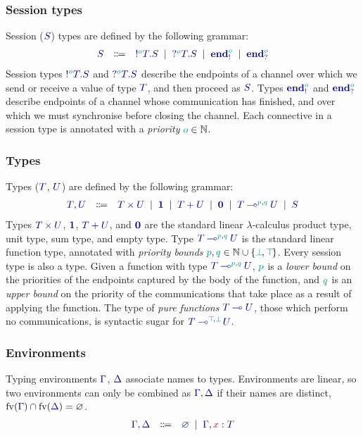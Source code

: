 \documentclass[main.tex]{subfiles}
\begin{document}
\subsubsection*{Session types}
Session ($\ty{S}$) types are defined by the following grammar:
\[
\begin{array}{lcl}
  \ty{S}
  & \Coloneqq & \ty{\tysend[\cs{o}]{T}{S}}
    \sep        \ty{\tyrecv[\cs{o}]{T}{S}}
    \sep        \ty{\tyends[\cs{o}]}
    \sep        \ty{\tyendr[\cs{o}]}
\end{array}
\]
Session types $\ty{\tysend[\cs{o}]{T}{S}}$ and $\ty{\tyrecv[\cs{o}]{T}{S}}$ describe the endpoints of a channel over which we send or receive a value of type $\ty{T}$, and then proceed as $\ty{S}$. Types $\ty{\tyends[\cs{o}]}$ and $\ty{\tyendr[\cs{o}]}$ describe endpoints of a channel whose communication has finished, and over which we must synchronise before closing the channel. Each connective in a session type is annotated with a \emph{priority} $\cs{o}\in\mathbb{N}$.

\subsubsection*{Types}
Types ($\ty{T}$, $\ty{U}$) are defined by the following grammar:
\[
\begin{array}{lcl}
  \ty{T}, \ty{U}
  & \Coloneqq & \ty{\typrod{T}{U}}
    \sep        \ty{\tyunit}
    \sep        \ty{\tysum{T}{U}}
    \sep        \ty{\tyvoid}
    \sep        \ty{\tylolli[\cs{p},\cs{q}]{T}{U}}
    \sep        \ty{S}
\end{array}
\]
Types $\ty{\typrod{T}{U}}$, $\ty{\tyunit}$, $\ty{\tysum{T}{U}}$, and $\ty{\tyvoid}$ are the standard linear $\lambda$-calculus product type, unit type, sum type, and empty type.
Type $\ty{\tylolli[\cs{p},\cs{q}]{T}{U}}$ is the standard linear function type, annotated with \emph{priority bounds} $\cs{p},\cs{q}\in\mathbb{N}\cup\{\cs{\pbot},\cs{\ptop}\}$.
Every session type is also a type.
Given a function with type $\ty{\tylolli[\cs{p},\cs{q}]{T}{U}}$, $\cs{p}$ is a \emph{lower bound} on the priorities of the endpoints captured by the body of the function, and $\cs{q}$ is an \emph{upper bound} on the priority of the communications that take place as a result of applying the function. The type of \emph{pure functions} $\ty{\tylolli{T}{U}}$, \ie those which perform no communications, is syntactic sugar for $\ty{\tylolli[\cs{\ptop},\cs{\pbot}]{T}{U}}$.

\subsubsection*{Environments}
Typing environments $\ty{\Gamma}$, $\ty{\Delta}$ associate names to types. Environments are linear, so two environments can only be combined as $\ty{\Gamma}, \ty{\Delta}$ if their names are distinct, \ie $\fv(\ty{\Gamma})\cap\fv(\ty{\Delta})=\varnothing$.
\[
\begin{array}{lcl}
  \ty{\Gamma}, \ty{\Delta}
  & \Coloneqq & \ty{\emptyenv}
    \sep        \ty{\Gamma}, \tmty{x}{T}
\end{array}
\]
\end{document}

